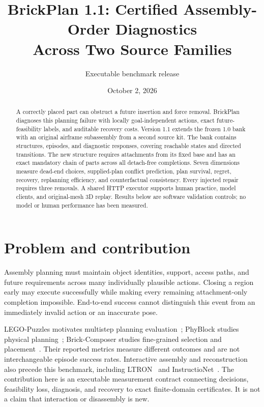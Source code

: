 \documentclass[10pt,twocolumn]{article}
\title{BrickPlan 1.1: Certified Assembly-Order Diagnostics\\Across Two Source Families}
\author{Executable benchmark release}
\date{October 2, 2026}
\begin{document}
\maketitle
\begin{abstract}
A correctly placed part can obstruct a future insertion and force removal.
BrickPlan diagnoses this planning failure with locally goal-independent actions,
exact future-feasibility labels, and auditable recovery costs. Version 1.1 extends
the frozen 1.0 bank with an original airframe subassembly from a second source
kit. The bank contains \StructureCount{} structures, \EpisodeCount{} episodes,
and \ProbeCount{} diagnostic responses, covering \StateCount{} reachable states
and \EdgeCount{} directed transitions. The new structure requires
\AirframeActions{} attachments from its fixed base and has an exact mandatory
chain of \AirframeChain{} parts across all detach-free completions.
Seven dimensions measure dead-end choices, supplied-plan conflict prediction,
plan survival, regret, recovery, replanning efficiency, and counterfactual
consistency. Every injected repair requires three removals. A shared HTTP
executor supports human practice, model clients, and original-mesh 3D replay.
Results below are software validation controls; no model or human performance
has been measured.
\end{abstract}

\section{Problem and contribution}
Assembly planning must maintain object identities, support, access paths, and
future requirements across many individually plausible actions. Closing a region
early may execute successfully while making every remaining attachment-only
completion impossible. End-to-end success cannot distinguish this event from
an immediately invalid action or an inaccurate pose.

LEGO-Puzzles motivates multistep planning evaluation~\cite{legopuzzles};
PhyBlock studies physical planning~\cite{phyblock}; Brick-Composer studies
fine-grained selection and placement~\cite{composer}. Their reported metrics
measure different outcomes and are not interchangeable episode success rates.
Interactive assembly and reconstruction also precede this benchmark, including
LTRON~\cite{ltron} and InstructioNet~\cite{instructionet}.
The contribution here is an executable measurement contract connecting
decisions, feasibility loss, diagnosis, and recovery to exact finite-domain
certificates. It is not a claim that interaction or disassembly is new.
\end{document}
